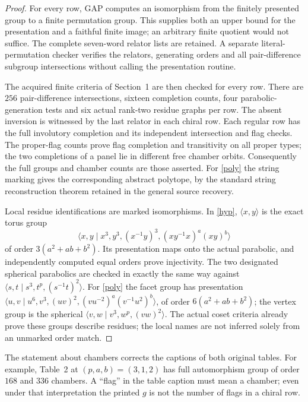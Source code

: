 \documentclass[11pt,a4paper]{article}
\newcommand{\gen}[1]{\langle #1\rangle}\newcommand{\Aut}{\operatorname{Aut}}
\begin{document}
\begin{proof}
For every row, GAP computes an isomorphism from the finitely presented
group to a finite permutation group. This supplies both an upper bound
for the presentation and a faithful finite image; an arbitrary finite
quotient would not suffice. The complete seven-word relator lists are
retained. A separate literal-permutation checker verifies the relators,
generating orders and all pair-difference subgroup intersections without
calling the presentation routine.

The acquired finite criteria of Section~1 are then checked for every
row. There are $256$ pair-difference intersections, sixteen completion
counts, four parabolic-generation tests and six actual rank-two residue
graphs per row. The absent inversion is witnessed by the last relator
in each chiral row. Each regular row has the full involutory completion
and its independent intersection and flag checks. The proper-flag
counts prove flag completion and transitivity on all proper types;
the two completions of a panel lie in different free chamber orbits.
Consequently the full groups and chamber counts are those asserted.
For \eqref{poly} the string marking gives the corresponding abstract
polytope, by the standard string reconstruction theorem retained in
the general source recovery.

Local residue identifications are marked isomorphisms. In \eqref{hyp},
$\gen{x,y}$ is the exact torus group
\[
 \gen{x,y\mid x^3,y^3,(x^{-1}y)^3,(xy^{-1}x)^a(xy)^b}
\]
of order $3(a^2+ab+b^2)$. Its presentation maps onto the actual
parabolic, and independently computed equal orders prove injectivity.
The two designated spherical parabolics are checked in exactly the
same way against $\gen{s,t\mid s^3,t^p,(s^{-1}t)^2}$.
For \eqref{poly} the facet group has presentation
$\gen{u,v\mid u^6,v^3,(uv)^2,(vu^{-2})^a(v^{-1}u^2)^b}$,
of order $6(a^2+ab+b^2)$; the vertex group is the spherical
$\gen{v,w\mid v^3,w^p,(vw)^2}$.
The actual coset criteria already prove these groups describe residues;
the local names are not inferred solely from an unmarked order match.
\end{proof}

The statement about chambers corrects the captions of both original
tables. For example, Table~2 at $(p,a,b)=(3,1,2)$ has full automorphism
group of order $168$ and $336$ chambers. A ``flag'' in the table caption
must mean a chamber; even under that interpretation the printed $g$
is not the number of flags in a chiral row.
\end{document}
